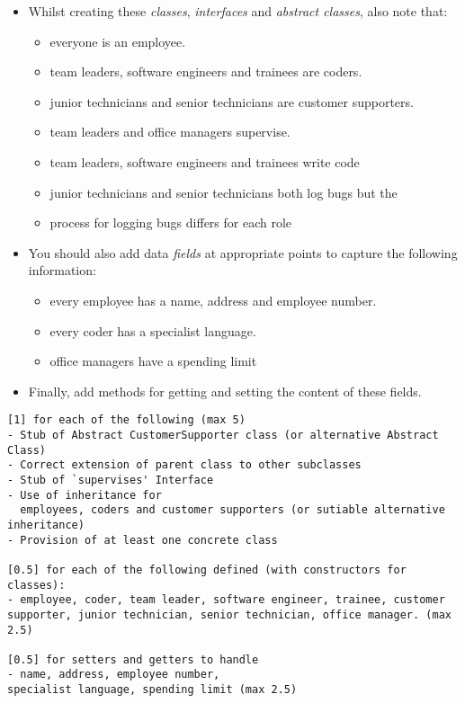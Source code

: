\documentclass{exam}
\begin{document}
\begin{question}
\begin{roster}
\begin{itemize}
\begin{itemize}
\end{itemize}
\item Whilst creating these \textit{classes}, \textit{interfaces} and \textit{abstract classes}, also note that:
\begin{itemize}
\item everyone is an employee.
\item team leaders, software engineers and trainees are coders.
\item junior technicians and senior technicians are customer supporters.
\item team leaders and office managers supervise.
\item team leaders, software engineers and trainees write code 
\item junior technicians and senior technicians both log bugs but the 
\item process for logging bugs differs for each role
\end{itemize}
\item You should also add data \textit{fields} at appropriate points to capture the following information: 
\begin{itemize}
\item every employee has a name, address and employee number.
\item every coder has a specialist language. 
\item office managers have a spending limit
\end{itemize}
\bigskip
\item Finally, add methods for getting and setting the content of these fields. 

\end{itemize}
\color{red}
\begin{lstlisting}
[1] for each of the following (max 5)
- Stub of Abstract CustomerSupporter class (or alternative Abstract Class)
- Correct extension of parent class to other subclasses
- Stub of `supervises' Interface
- Use of inheritance for 
  employees, coders and customer supporters (or sutiable alternative inheritance)
- Provision of at least one concrete class

[0.5] for each of the following defined (with constructors for classes):
- employee, coder, team leader, software engineer, trainee, customer supporter, junior technician, senior technician, office manager. (max 2.5)

[0.5] for setters and getters to handle
- name, address, employee number, 
specialist language, spending limit (max 2.5)
\end{lstlisting}
\color{black}


\end{roster}
\end{question}
\end{document}
